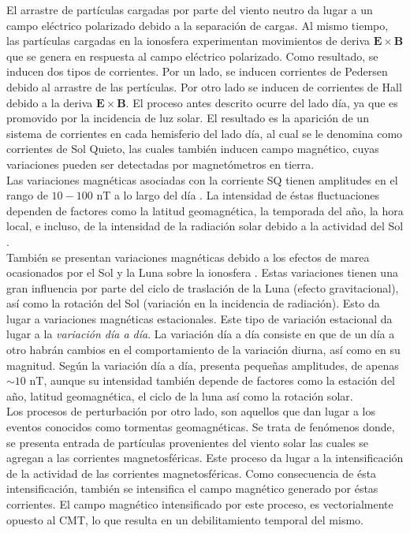 \documentclass[preprint,12pt]{article}
\begin{document}
El arrastre de partículas cargadas por parte del viento neutro da lugar a un campo eléctrico polarizado debido a la separación de cargas. Al mismo tiempo, las partículas cargadas en la ionosfera experimentan movimientos de deriva $\mathbf{E \times B}$ que se genera en respuesta al campo eléctrico polarizado. Como resultado, se inducen dos tipos de corrientes. Por un lado, se inducen corrientes de Pedersen debido al arrastre de las pertículas. Por otro lado se inducen de corrientes de Hall debido a la deriva $\mathbf{E \times B}$. El proceso antes descrito ocurre del lado día, ya que es promovido por la incidencia de luz solar. El resultado es la aparición de un sistema de corrientes en cada hemisferio del lado día, al cual se le denomina como corrientes de Sol Quieto, las cuales también inducen campo magnético, cuyas variaciones pueden ser detectadas por magnetómetros en tierra.\\

Las variaciones magnéticas asociadas con la corriente SQ tienen amplitudes en el rango de $10-100$ nT a lo largo del día \cite{iaga_guide, baseline_Gjerloev}. La intensidad de éstas fluctuaciones dependen de factores como la latitud geomagnética, la temporada del año, la hora local, e incluso, de la intensidad de la radiación solar debido a la actividad del Sol \cite{iaga_guide, gombosi_1998, l_handbook_geof_sw_Geom_field}.\\


También se presentan variaciones magnéticas debido a los efectos de marea ocasionados por el Sol y la Luna sobre la ionosfera \cite{BARTELS_kp}.  Estas variaciones tienen una gran influencia por parte del ciclo de traslación de la Luna (efecto gravitacional), así como la rotación del Sol (variación en la incidencia de radiación). Esto da lugar a variaciones magnéticas estacionales. Este tipo de variación estacional da lugar a la \emph{variación día a día}. La variación día a día consiste en que de un día a otro habrán cambios en el comportamiento de la variación diurna, así como en su magnitud. Según \cite{iaga_guide} la variación día a día, presenta pequeñas amplitudes, de apenas $\sim 10$ nT, aunque su intensidad también depende de factores como la estación del año, latitud geomagnética, el ciclo de la luna así como la rotación solar.\\


Los procesos de perturbación por otro lado, son aquellos que dan lugar a los eventos conocidos como tormentas geomagnéticas. Se trata de fenómenos donde, se presenta entrada de partículas provenientes del viento solar las cuales se agregan a las corrientes magnetosféricas. Este proceso da lugar a la intensificación de la actividad de las corrientes magnetosféricas. Como consecuencia de ésta intensificación, también se intensifica el campo magnético generado por éstas corrientes. El campo magnético intensificado por este proceso, es vectorialmente opuesto al CMT, lo que resulta en un debilitamiento temporal del mismo.\\
\end{document}
